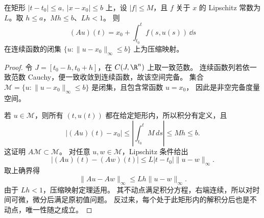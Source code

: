 \begin{proposition}[Picard 算子]
在矩形 $|t-t_0|\leq a,\ |x-x_0|\leq b$ 上，设 $|f|\leq M$，且 $f$ 关于 $x$
的 Lipschitz 常数为 $L$。取 $h\leq a$，$Mh\leq b$、$Lh<1$。
则
\[
 (Au)(t)=x_0+\int_{t_0}^tf(s,u(s))\,\dd s
\]
在连续函数的闭集 $\{u:\|u-x_0\|_\infty\leq b\}$ 上为压缩映射。
\end{proposition}
\begin{proof}
令 $J=[t_0-h,t_0+h]$，在 $C(J,\R^n)$ 上取一致范数。
连续函数列若依一致范数 Cauchy，便一致收敛到连续函数，故该空间完备。
集合 $\mathcal M=\{u:\|u-x_0\|_\infty\leq b\}$ 是闭集，且包含常函数 $u=x_0$，
因此是非空完备度量空间。

若 $u\in\mathcal M$，则所有 $(t,u(t))$ 都在给定矩形内，所以积分有定义，且
\[
 |(Au)(t)-x_0|\leq\left|\int_{t_0}^t M\,ds\right|
 \leq Mh\leq b.
\]
这证明 $A\mathcal M\subset\mathcal M$。
对任意 $u,w\in\mathcal M$，Lipschitz 条件给出
\[
 |(Au)(t)-(Aw)(t)|\leq L|t-t_0|\|u-w\|_\infty.
\]
取上确界得 
\[
 \|Au-Aw\|_\infty\leq Lh\|u-w\|_\infty.
\]
由于 $Lh<1$，压缩映射定理适用。
其不动点满足积分方程，右端连续，所以对时间可微，微分后满足原初值问题。
反过来，每个处于此矩形内的解积分后也是不动点，唯一性随之成立。
\end{proof}

